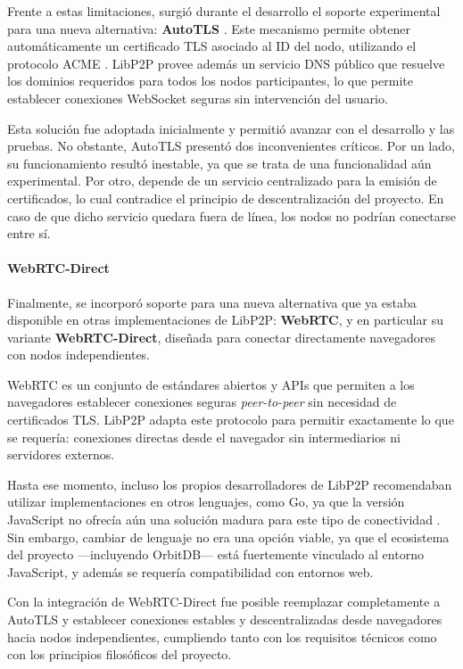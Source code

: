 Frente a estas limitaciones, surgió durante el desarrollo el soporte experimental para una nueva alternativa: \textbf{AutoTLS} \cite{autotls}. Este mecanismo permite obtener automáticamente un certificado TLS asociado al ID del nodo, utilizando el protocolo ACME \cite{acme}. LibP2P provee además un servicio DNS público que resuelve los dominios requeridos para todos los nodos participantes, lo que permite establecer conexiones WebSocket seguras sin intervención del usuario.

Esta solución fue adoptada inicialmente y permitió avanzar con el desarrollo y las pruebas. No obstante, AutoTLS presentó dos inconvenientes críticos. Por un lado, su funcionamiento resultó inestable, ya que se trata de una funcionalidad aún experimental. Por otro, depende de un servicio centralizado para la emisión de certificados, lo cual contradice el principio de descentralización del proyecto. En caso de que dicho servicio quedara fuera de línea, los nodos no podrían conectarse entre sí.

\paragraph{WebRTC-Direct}

Finalmente, se incorporó soporte para una nueva alternativa que ya estaba disponible en otras implementaciones de LibP2P: \textbf{WebRTC}, y en particular su variante \textbf{WebRTC-Direct}, diseñada para conectar directamente navegadores con nodos independientes.

WebRTC es un conjunto de estándares abiertos y APIs que permiten a los navegadores establecer conexiones seguras \textit{peer-to-peer} sin necesidad de certificados TLS. LibP2P adapta este protocolo para permitir exactamente lo que se requería: conexiones directas desde el navegador sin intermediarios ni servidores externos.

Hasta ese momento, incluso los propios desarrolladores de LibP2P recomendaban utilizar implementaciones en otros lenguajes, como Go, ya que la versión JavaScript no ofrecía aún una solución madura para este tipo de conectividad \cite{differences-nodejs-browser}. Sin embargo, cambiar de lenguaje no era una opción viable, ya que el ecosistema del proyecto —incluyendo OrbitDB— está fuertemente vinculado al entorno JavaScript, y además se requería compatibilidad con entornos web.

Con la integración de WebRTC-Direct fue posible reemplazar completamente a AutoTLS y establecer conexiones estables y descentralizadas desde navegadores hacia nodos independientes, cumpliendo tanto con los requisitos técnicos como con los principios filosóficos del proyecto.

